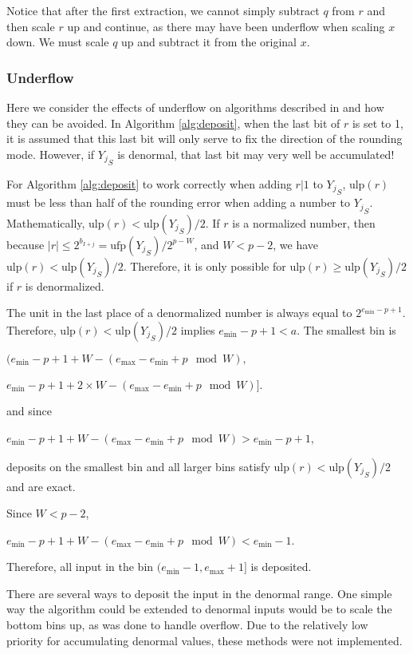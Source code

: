 \documentclass[12pt]{article}
\providecommand{\min}{\ensuremath{\text{min}}}
\providecommand{\max}{\ensuremath{\text{max}}}
\providecommand{\ulp}{\ensuremath{\text{ulp}}}
\providecommand{\ufp}{\ensuremath{\text{ufp}}}
\theoremstyle{plain}
\begin{document}
      Notice that after the first extraction, we cannot simply subtract $q$ from $r$ and then scale $r$ up and continue, as there may have been underflow when scaling $x$ down. We must scale $q$ up and subtract it from the original $x$.

    \subsubsection{Underflow}
      \label{sec:underflow}
      Here we consider the effects of underflow on algorithms described in \cite{repsum} and how they can be avoided. In Algorithm \ref{alg:deposit}, when the last bit of $r$ is set to 1, it is assumed that this last bit will only serve to fix the direction of the rounding mode. However, if ${Y_j}_S$ is denormal, that last bit may very well be accumulated!

      For Algorithm \ref{alg:deposit} to work correctly when adding $r | 1$ to ${Y_j}_S$, $\ulp(r)$ must be less than half of the rounding error when adding a number to ${Y_j}_S$. Mathematically, $\ulp(r) < \ulp({Y_j}_S)/2$.
      If $r$ is a normalized number, then because $|r| \leq 2^{b_{I + j}} = \ufp({Y_j}_S)/2^{p - W}$, and $W < p - 2$, we have $\ulp(r) < \ulp({Y_j}_S)/2$. Therefore, it is only possible for $\ulp(r) \geq \ulp({Y_j}_S)/2$ if $r$ is denormalized.

      The unit in the last place of a denormalized number is always equal to $2^{e_{\min} - p + 1}$. Therefore, $\ulp(r) < \ulp({Y_j}_S)/2$ implies $e_{\min} - p + 1 < a$. The smallest bin is

      $(e_{\min} - p + 1 + W - (e_{\max} - e_{\min} + p \mod W),$

      \indent \indent $e_{\min} - p + 1 + 2 \times W - (e_{\max} - e_{\min} + p \mod W)]$.

      and since

      $e_{\min} - p + 1 + W - (e_{\max} - e_{\min} + p \mod W) > e_{\min} - p + 1$,

      deposits on the smallest bin and all larger bins satisfy $\ulp(r) < \ulp({Y_j}_S)/2$ and are exact.

      Since $W < p - 2$,

      $e_{\min} - p + 1 + W - (e_{\max} - e_{\min} + p \mod W) < e_{\min} - 1$.

      Therefore, all input in the bin $(e_{\min} - 1, e_{\max} + 1]$ is deposited.

      There are several ways to deposit the input in the denormal range. One simple way the algorithm could be extended to denormal inputs would be to scale the bottom bins up, as was done to handle overflow. Due to the relatively low priority for accumulating denormal values, these methods were not implemented.
\end{document}
